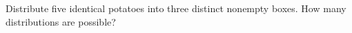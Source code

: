 Distribute five identical potatoes into three distinct nonempty boxes. How many distributions are possible?
